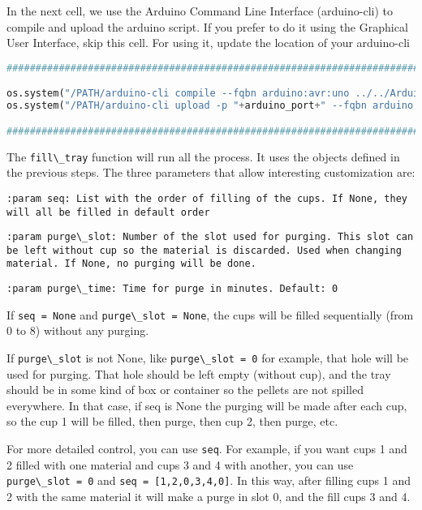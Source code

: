 In the next cell, we use the Arduino Command Line Interface
(arduino-cli) to compile and upload the arduino script. If you prefer to
do it using the Graphical User Interface, skip this cell. For using it,
update the location of your arduino-cli

\begin{lstlisting}[language=Python]
###############################################################################################################

os.system("/PATH/arduino-cli compile --fqbn arduino:avr:uno ../../Arduino/Pellet_sorter_v2/Pellet_sorter_v2.ino")
os.system("/PATH/arduino-cli upload -p "+arduino_port+" --fqbn arduino:avr:uno ../../Arduino/Pellet_sorter_v2/Pellet_sorter_v2.ino")

###############################################################################################################
\end{lstlisting}

The \passthrough{\lstinline!fill\_tray!} function will run all the
process. It uses the objects defined in the previous steps. The three
parameters that allow interesting customization are:

\passthrough{\lstinline!:param seq: List with the order of filling of the cups. If None, they will all be filled in default order!}

\passthrough{\lstinline!:param purge\_slot: Number of the slot used for purging. This slot can be left without cup so the material is discarded. Used when changing material. If None, no purging will be done.!}

\passthrough{\lstinline!:param purge\_time: Time for purge in minutes. Default: 0!}

If \passthrough{\lstinline!seq = None!} and
\passthrough{\lstinline!purge\_slot = None!}, the cups will be filled
sequentially (from 0 to 8) without any purging.

If \passthrough{\lstinline!purge\_slot!} is not None, like
\passthrough{\lstinline!purge\_slot = 0!} for example, that hole will be
used for purging. That hole should be left empty (without cup), and the
tray should be in some kind of box or container so the pellets are not
spilled everywhere. In that case, if seq is None the purging will be
made after each cup, so the cup 1 will be filled, then purge, then cup
2, then purge, etc.

For more detailed control, you can use \passthrough{\lstinline!seq!}.
For example, if you want cups 1 and 2 filled with one material and cups
3 and 4 with another, you can use
\passthrough{\lstinline!purge\_slot = 0!} and
\passthrough{\lstinline!seq = [1,2,0,3,4,0]!}. In this way, after
filling cups 1 and 2 with the same material it will make a purge in slot
0, and the fill cups 3 and 4.

